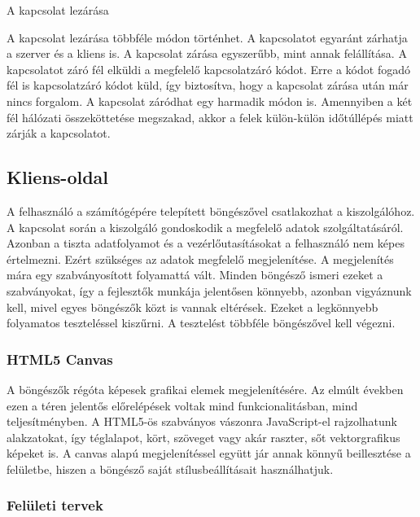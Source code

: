 \documentclass[]{article}
\begin{document}
A kapcsolat lezárása

A kapcsolat lezárása többféle módon történhet. A kapcsolatot egyaránt
zárhatja a szerver és a kliens is. A kapcsolat zárása egyszerűbb, mint
annak felállítása. A kapcsolatot záró fél elküldi a megfelelő
kapcsolatzáró kódot. Erre a kódot fogadó fél is kapcsolatzáró kódot
küld, így biztosítva, hogy a kapcsolat zárása után már nincs forgalom. A
kapcsolat záródhat egy harmadik módon is. Amennyiben a két fél hálózati
összeköttetése megszakad, akkor a felek külön-külön időtúllépés miatt
zárják a kapcsolatot.

\hypertarget{kliens-oldal}{%
\subsection{Kliens-oldal}\label{kliens-oldal}}

A felhasználó a számítógépére telepített böngészővel csatlakozhat a
kiszolgálóhoz. A kapcsolat során a kiszolgáló gondoskodik a megfelelő
adatok szolgáltatásáról. Azonban a tiszta adatfolyamot és a
vezérlőutasításokat a felhasználó nem képes értelmezni. Ezért szükséges
az adatok megfelelő megjelenítése. A megjelenítés mára egy
szabványosított folyamattá vált. Minden böngésző ismeri ezeket a
szabványokat, így a fejlesztők munkája jelentősen könnyebb, azonban
vigyáznunk kell, mivel egyes böngészők közt is vannak eltérések. Ezeket
a legkönnyebb folyamatos teszteléssel kiszűrni. A tesztelést többféle
böngészővel kell végezni.

\hypertarget{html5-canvas}{%
\subsubsection{HTML5 Canvas}\label{html5-canvas}}

A böngészők régóta képesek grafikai elemek megjelenítésére. Az elmúlt
években ezen a téren jelentős előrelépések voltak mind
funkcionalitásban, mind teljesítményben. A HTML5-ös szabványos vászonra
JavaScript-el rajzolhatunk alakzatokat, így téglalapot, kört, szöveget
vagy akár raszter, sőt vektorgrafikus képeket is. A canvas alapú
megjelenítéssel együtt jár annak könnyű beillesztése a felületbe, hiszen
a böngésző saját stílusbeállításait használhatjuk.

\hypertarget{feluxfcleti-tervek}{%
\subsubsection{Felületi tervek}\label{feluxfcleti-tervek}}
\end{document}
